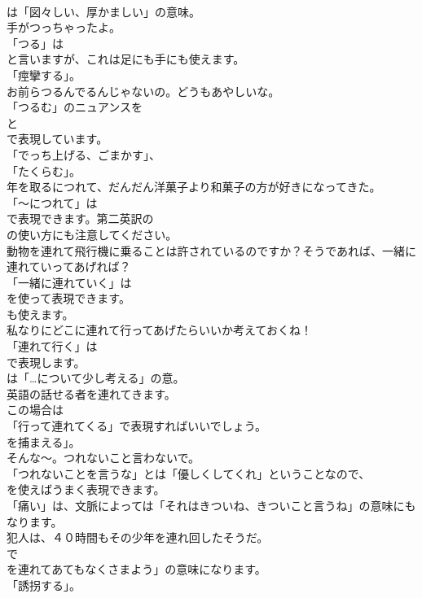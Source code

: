 \documentclass[8pt]{extreport}
\begin{document}
\begin{CJK}{UTF8}{min}
\\	は「図々しい、厚かましい」の意味。	
\\	手がつっちゃったよ。 
\\	「つる」は
\\	と言いますが、これは足にも手にも使えます。
\\	「痙攣する」。	
\\	お前らつるんでるんじゃないの。どうもあやしいな。 
\\	「つるむ」のニュアンスを
\\	と
\\	で表現しています。
\\	「でっち上げる、ごまかす」、
\\	「たくらむ」。	
\\	年を取るにつれて、だんだん洋菓子より和菓子の方が好きになってきた。 
\\	「～につれて」は
\\	で表現できます。第二英訳の
\\	の使い方にも注意してください。	
\\	動物を連れて飛行機に乗ることは許されているのですか？そうであれば、一緒に連れていってあげれば？ 
\\	「一緒に連れていく」は 
\\	を使って表現できます。
\\	も使えます。	
\\	私なりにどこに連れて行ってあげたらいいか考えておくね！ 
\\	「連れて行く」は 
\\	で表現します。
\\	は「…について少し考える」の意。	
\\	英語の話せる者を連れてきます。 
\\	この場合は
\\	「行って連れてくる」で表現すればいいでしょう。
\\	を捕まえる」。	
\\	そんな～。つれないこと言わないで。 
\\	「つれないことを言うな」とは「優しくしてくれ」ということなので、
\\	を使えばうまく表現できます。
\\	「痛い」は、文脈によっては「それはきついね、きついこと言うね」の意味にもなります。	
\\	犯人は、４０時間もその少年を連れ回したそうだ。 
\\	で
\\	を連れてあてもなくさまよう」の意味になります。
\\	「誘拐する」。	

\end{CJK}
\end{document}
